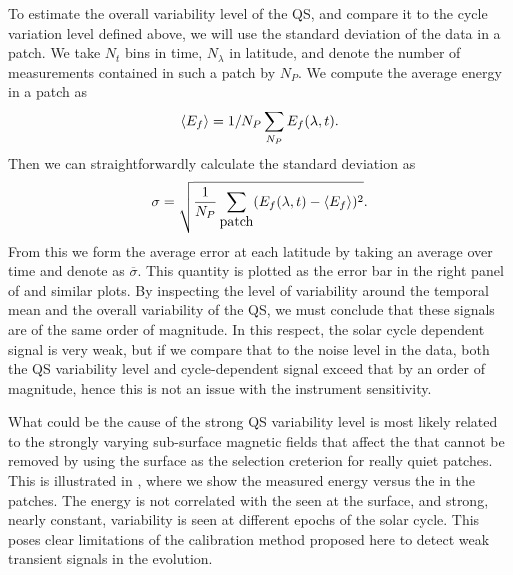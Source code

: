 \documentclass{aa}
\begin{document}
To estimate 
the overall variability level of the QS, and compare it to the cycle variation level defined above,
we will use the standard deviation of the data in a patch.
We take $N_t$ bins in time, $N_\lambda$ in latitude, and denote the number of \ef measurements contained in such a patch by $N_P$. We compute the average \fff energy in a patch as
\begin{equation}
\langle E_f \rangle=1/N_P \sum_{N_P} E_f (\lambda,t).
\end{equation}
Then we can straightforwardly calculate the standard deviation as
\begin{equation}
\sigma= \sqrt{\frac{1}{N_P}\sum_{\mbox{patch}} ( E_f(\lambda,t)
- \left<{E_f} \right>)^2}.
\end{equation}
From this we form the average error at each latitude by taking an average over time and denote as $\overline{\sigma}$. 
This quantity is plotted as the error bar in the right panel of  and similar plots.
By inspecting the level of variability around the temporal mean and the 
overall variability of the QS, we must conclude that these signals are of the same order of magnitude. 
In this respect, the solar cycle dependent signal is very weak, but if we compare that to the noise level in the data, both the QS variability level and cycle-dependent signal exceed that by an order of magnitude, hence this is not an issue with the instrument sensitivity.

What could be the cause of the strong QS variability level is most likely related to the strongly varying sub-surface magnetic fields that affect the \fff that cannot be removed by using the surface \brms{} as the selection creterion for really quiet patches. This is illustrated in , where we show the measured \fff energy versus the \brms{} in the patches. The \fff energy is not correlated with the \brms{} seen at the surface, and strong, nearly constant, variability is seen at different epochs of the solar cycle. This poses clear limitations of the calibration method proposed here to detect weak transient signals in the \fff evolution.
\end{document}
